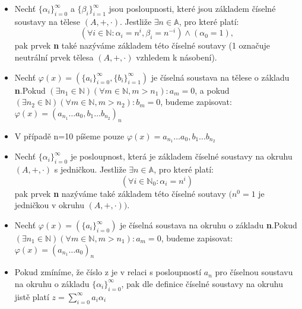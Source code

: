 \documentclass[czech,bachelor,dept470,male]{diploma}
\newcommand{\poslbeta}{\{\beta_i\}_{i=1}^{\infty}}
\newcommand{\poslalpha}{\{\alpha_i\}_{i=0}^{\infty}}
\newcommand{\posla}{\{a_i\}_{i=0}^{\infty}}
\newcommand{\poslb}{\{b_i\}_{i=1}^{\infty}}
\begin{document}
\begin{agreement}\label{u1}
	\begin{itemize}
		\item Nechť $\poslalpha$ a $\poslbeta$  jsou posloupnosti, které jsou základem číselné soustavy na tělese $(A,+,\cdot)$. Jestliže $\exists n \in \mathbb{A}$, pro které platí:
		$$ (\forall i \in \mathbb{N} : \alpha_i = n^i,\beta_i = n^{-i}) \land (\alpha_{0} = 1),$$
		pak prvek \textbf{n} také nazýváme základem této číselné soutavy (1 označuje neutrální prvek tělesa $(A,+,\cdot)$ vzhledem k násobení).
		\item Nechť $\varphi(x) = (\posla,\poslb)$ je číselná soustava na tělese o základu \textbf{n}.\newline Pokud $(\exists n_1 \in \mathbb{N}) (\forall m \in \mathbb{N},m>n_1):a_m = 0$, a pokud $(\exists n_2 \in \mathbb{N}) (\forall m \in \mathbb{N},m>n_2):b_m = 0$, budeme zapisovat: $\varphi(x) = (a_{n_1} \dots a_0,b_1 \dots b_{n_2})_n$
		\item V případě n=10 píšeme pouze $\varphi(x) = a_{n_1} \dots a_0,b_1 \dots b_{n_2}$
		\item Nechť $\poslalpha$ je posloupnost, která je základem číselné soustavy na okruhu $(A,+,\cdot)$ s jedničkou. Jestliže $\exists n \in \mathbb{A}$, pro které platí:
		$$ (\forall i \in \mathbb{N}_0 : \alpha_i = n^i)$$
		pak prvek \textbf{n} nazýváme také základem této číselné soutavy $(n^0=1$ je jedničkou v okruhu $(A,+,\cdot))$.
		\item Nechť $\varphi(x) = (\posla)$ je číselná soustava na okruhu o základu \textbf{n}.\newline Pokud $(\exists n_1 \in \mathbb{N}) (\forall m \in \mathbb{N},m>n_1):a_m = 0$, budeme zapisovat: $\varphi(x) = (a_{n_1} \dots a_0)_n$
		\item Pokud zmíníme, že číslo z je v relaci s posloupností $a_n$ pro číselnou soustavu na okruhu o základu $\{\alpha_i\}_{i=0}^\infty$, pak dle definice číselné soustavy na okruhu jistě platí $z = \sum_{i=0}^{\infty} a_{i}\alpha_{i}$
		\end{itemize}
\end{agreement}
\end{document}
